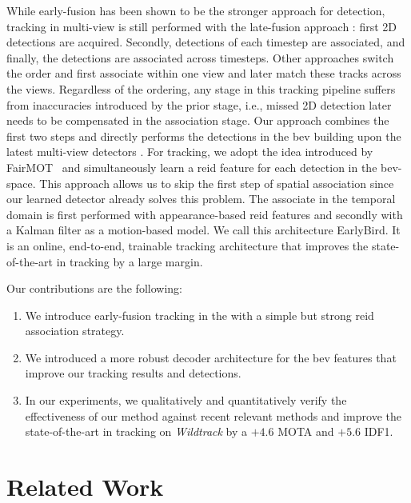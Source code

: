 \documentclass[10pt,twocolumn,letterpaper]{article}
\def\sname{EarlyBird\xspace}
\begin{document}
While early-fusion has been shown to be the stronger approach for detection, tracking in multi-view is still performed with the late-fusion approach \cite{hofmann2013hypergraphs, cheng2023rest}: first 2D detections are acquired. Secondly, detections of each timestep are associated, and finally, the detections are associated across timesteps. Other approaches \cite{synthehicle2023herzog, nguyen2022lmgp} switch the order and first associate within one view and later match these tracks across the views. Regardless of the ordering, any stage in this tracking pipeline suffers from inaccuracies introduced by the prior stage, i.e., missed 2D detection later needs to be compensated in the association stage. Our approach combines the first two steps and directly performs the detections in the \gls{bev} building upon the latest multi-view detectors \cite{hou2021multiview}. For tracking, we adopt the idea introduced by FairMOT~\cite{zhang2021fairmot} and simultaneously learn a \gls{reid} feature for each detection in the \gls{bev}-space. This approach allows us to skip the first step of spatial association since our learned detector already solves this problem. The associate in the temporal domain is first performed with appearance-based \gls{reid} features and secondly with a Kalman filter \cite{kalman1960new} as a motion-based model. We call this architecture \sname. It is an online, end-to-end, trainable tracking architecture that improves the state-of-the-art in tracking by a large margin.

Our contributions are the following:
\begingroup
\renewcommand\labelenumi{\theenumi)}
\begin{enumerate}[nosep]
\item We introduce early-fusion tracking in the  with a simple but strong \gls{reid} association strategy.

\item We introduced a more robust decoder architecture for the \gls{bev} features that improve our tracking results and detections. 

\item  In our experiments, we qualitatively and quantitatively verify the effectiveness of our method against recent relevant methods and improve the state-of-the-art in tracking on \textit{Wildtrack} by a $+4.6$ MOTA and $+5.6$ IDF1.
\end{enumerate}
\endgroup

 \section{Related Work}\label{sec:related}
\end{document}
